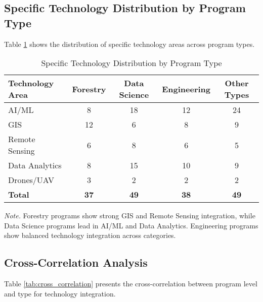 \documentclass[12pt]{article}
\begin{document}
\subsection{Specific Technology Distribution by Program Type}
Table \ref{tab:specific_tech_by_type} shows the distribution of specific technology areas across program types.

\begin{table}[H]
\centering
\caption{Specific Technology Distribution by Program Type}
\label{tab:specific_tech_by_type}
\begin{tabular}{lcccc}
\toprule
\textbf{Technology Area} & \textbf{Forestry} & \textbf{Data Science} & \textbf{Engineering} & \textbf{Other Types} \\
\midrule
AI/ML & 8 & 18 & 12 & 24 \\
GIS & 12 & 6 & 8 & 9 \\
Remote Sensing & 6 & 8 & 6 & 5 \\
Data Analytics & 8 & 15 & 10 & 9 \\
Drones/UAV & 3 & 2 & 2 & 2 \\
\midrule
\textbf{Total} & \textbf{37} & \textbf{49} & \textbf{38} & \textbf{49} \\
\bottomrule
\end{tabular}
\small
\textit{Note.} Forestry programs show strong GIS and Remote Sensing integration, while Data Science programs lead in AI/ML and Data Analytics. Engineering programs show balanced technology integration across categories.
\end{table}

\subsection{Cross-Correlation Analysis}
Table \ref{tab:cross_correlation} presents the cross-correlation between program level and type for technology integration.
\end{document}
